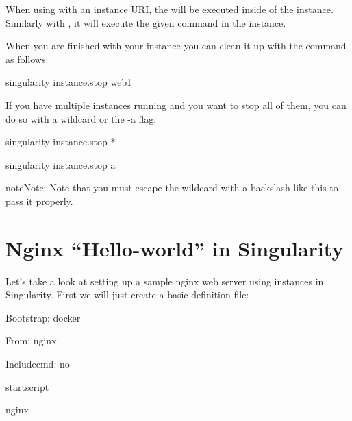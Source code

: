 \documentclass[letterpaper,10pt,english]{sphinxmanual}
\begin{document}
When using  with an instance URI, the  will be executed inside of the
instance. Similarly with , it will execute the given command in the
instance.

When you are finished with your instance you can clean it up with the
{\hyperref[\detokenize{appendix:instance-stop}]{}} command as follows:

%
\begin{sphinxVerbatim}[commandchars=\\\{\}]
\PYGZdl{} singularity instance.stop web1
\end{sphinxVerbatim}

If you have multiple instances running and you want to stop all of
them, you can do so with a wildcard or the -a flag:

%
\begin{sphinxVerbatim}[commandchars=\\\{\}]
\PYGZdl{} singularity instance.stop \PYGZbs{}*

\PYGZdl{} singularity instance.stop \PYGZhy{}a
\end{sphinxVerbatim}

\begin{sphinxadmonition}{note}{Note:}
Note that you must escape the wildcard with a backslash like this \sphinxcode{\sphinxupquote{\textbackslash{}*}} to
pass it properly.
\end{sphinxadmonition}


\section{Nginx “Hello-world” in Singularity}
\label{\detokenize{running_services:nginx-hello-world-in-singularity}}
Let’s take a look at setting up a sample nginx web server using
instances in Singularity. First we will just create a basic definition
file:

%
\begin{sphinxVerbatim}[commandchars=\\\{\}]
Bootstrap: docker

From: nginx

Includecmd: no


\PYGZpc{}startscript

    nginx
\end{sphinxVerbatim}
\end{document}
